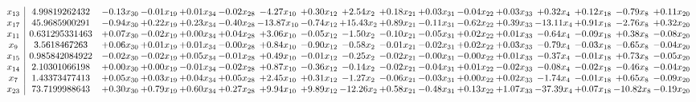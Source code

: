 \documentclass[9pt]{article}
\begin{document}
 \[\begin{array}{c| c c@{\hskip 2pt} c@{\hskip 2pt} c@{\hskip 2pt} c@{\hskip 2pt} c@{\hskip 2pt} c@{\hskip 2pt} c@{\hskip 2pt} c@{\hskip 2pt} c@{\hskip 2pt} c@{\hskip 2pt} c@{\hskip 2pt} c@{\hskip 2pt} c@{\hskip 2pt} c@{\hskip 2pt} c@{\hskip 2pt} }
 x_{13}   &  4.99819262432 & -0.13 x_{30} & -0.01 x_{19} & +  0.01 x_{34} & -0.02 x_{28} & -4.27 x_{10} & +  0.30 x_{12} & +  2.54 x_{2} & +  0.18 x_{21} & +  0.03 x_{31} & -0.04 x_{22} & +  0.03 x_{33} & +  0.32 x_{4} & +  0.12 x_{18} & -0.79 x_{8} & +  0.11 x_{20}\\
 x_{17}   &  45.9685900291 & -0.94 x_{30} & +  0.22 x_{19} & +  0.23 x_{34} & -0.40 x_{28} & -13.87 x_{10} & -0.74 x_{12} & + 15.43 x_{2} & +  0.89 x_{21} & -0.11 x_{31} & -0.62 x_{22} & +  0.39 x_{33} & -13.11 x_{4} & +  0.91 x_{18} & -2.76 x_{8} & +  0.32 x_{20}\\
 x_{11}   &  0.631295331463 & +  0.07 x_{30} & -0.02 x_{19} & +  0.00 x_{34} & +  0.04 x_{28} & +  3.06 x_{10} & -0.05 x_{12} & -1.50 x_{2} & -0.10 x_{21} & -0.05 x_{31} & +  0.02 x_{22} & +  0.01 x_{33} & -0.64 x_{4} & -0.09 x_{18} & +  0.38 x_{8} & -0.08 x_{20}\\
 x_{9}   &  3.5618467263 & +  0.06 x_{30} & +  0.01 x_{19} & +  0.01 x_{34} & -0.00 x_{28} & +  0.84 x_{10} & -0.90 x_{12} & -0.58 x_{2} & -0.01 x_{21} & -0.02 x_{31} & +  0.02 x_{22} & +  0.03 x_{33} & -0.79 x_{4} & -0.03 x_{18} & -0.65 x_{8} & -0.04 x_{20}\\
 x_{15}   &  0.985842084922 & -0.02 x_{30} & -0.02 x_{19} & +  0.05 x_{34} & -0.01 x_{28} & +  0.49 x_{10} & -0.01 x_{12} & -0.25 x_{2} & -0.02 x_{21} & -0.00 x_{31} & -0.00 x_{22} & +  0.01 x_{33} & -0.37 x_{4} & -0.01 x_{18} & +  0.73 x_{8} & -0.05 x_{20}\\
 x_{14}   &  2.10301066198 & +  0.00 x_{30} & +  0.00 x_{19} & -0.01 x_{34} & -0.02 x_{28} & +  0.87 x_{10} & -0.36 x_{12} & -0.14 x_{2} & -0.02 x_{21} & -0.04 x_{31} & +  0.01 x_{22} & -0.02 x_{33} & -0.08 x_{4} & -0.02 x_{18} & -0.46 x_{8} & -0.04 x_{20}\\
 x_{7}   &  1.43373477413 & +  0.05 x_{30} & +  0.03 x_{19} & +  0.04 x_{34} & +  0.05 x_{28} & +  2.45 x_{10} & +  0.31 x_{12} & -1.27 x_{2} & -0.06 x_{21} & -0.03 x_{31} & +  0.00 x_{22} & +  0.02 x_{33} & -1.74 x_{4} & -0.01 x_{18} & +  0.65 x_{8} & -0.09 x_{20}\\
 x_{23}   &  73.7199988643 & +  0.30 x_{30} & +  0.79 x_{19} & +  0.60 x_{34} & +  0.27 x_{28} & +  9.94 x_{10} & +  9.89 x_{12} & -12.26 x_{2} & +  0.58 x_{21} & -0.48 x_{31} & +  0.13 x_{22} & +  1.07 x_{33} & -37.39 x_{4} & +  0.07 x_{18} & -10.82 x_{8} & -0.19 x_{20}\\

\end{array}\]
\end{document}
